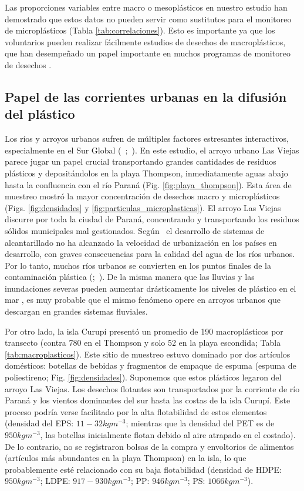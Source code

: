 Las proporciones variables entre macro o mesoplásticos en nuestro estudio han demostrado que estos datos no pueden servir como sustitutos para el monitoreo de microplásticos (Tabla \ref{tab:correlaciones}). Esto es importante ya que los voluntarios pueden realizar fácilmente estudios de desechos de macroplásticos, que han desempeñado un papel importante en muchos programas de monitoreo de desechos \parencite{RIBIC2012994}.

\subsection{Papel de las corrientes urbanas en la difusión del plástico}

Los ríos y arroyos urbanos sufren de múltiples factores estresantes interactivos, especialmente en el Sur Global (~\cite{WANG20171369};~\cite{wantzen2019urban}). En este estudio, el arroyo urbano Las Viejas parece jugar un papel crucial transportando grandes cantidades de residuos plásticos y depositándolos en la playa Thompson, inmediatamente aguas abajo hasta la confluencia con el río Paraná (Fig. \ref{fig:playa_thompson}). Esta área de muestreo mostró la mayor concentración de desechos macro y microplásticos (Figs. \ref{fig:densidades} y \ref{fig:particulas_microplasticas}). El arroyo Las Viejas discurre por toda la ciudad de Paraná, concentrando y transportando los residuos sólidos municipales mal gestionados. Según~\cite{Xu2019} el desarrollo de sistemas de alcantarillado no ha alcanzado la velocidad de urbanización en los países en desarrollo, con graves consecuencias para la calidad del agua de los ríos urbanos. Por lo tanto, muchos ríos urbanos se convierten en los puntos finales de la contaminación plástica (\cite{McCormick2014};~\cite{Mccormick2016}). De la misma manera que las lluvias y las inundaciones severas pueden aumentar drásticamente los niveles de plástico en el mar \parencite{GUNDOGDU2018342}, es muy probable que el mismo fenómeno opere en arroyos urbanos que descargan en grandes sistemas fluviales.

Por otro lado, la isla Curupí presentó un promedio de 190 macroplásticos por transecto (contra 780 en el Thompson y solo 52 en la playa escondida; Tabla \ref{tab:macroplasticos}). Este sitio de muestreo estuvo dominado por dos artículos domésticos: botellas de bebidas y fragmentos de empaque de espuma (espuma de poliestireno; Fig. \ref{fig:densidades}). Suponemos que estos plásticos legaron del arroyo Las Viejas. Los desechos flotantes son transportados por la corriente de río Paraná y los vientos dominantes del sur hasta las costas de la isla Curupí. Este proceso podría verse facilitado por la alta flotabilidad de estos elementos (densidad del EPS: $11-32 kg m^{-3}$; mientras que la densidad del PET es de $950 kg m^{-3}$, las botellas inicialmente flotan debido al aire atrapado en el costado). De lo contrario, no se registraron bolsas de la compra y envoltorios de alimentos (artículos más abundantes en la playa Thompson) en la isla, lo que probablemente esté relacionado con su baja flotabilidad (densidad de HDPE: $950 kg m^{-3}$; LDPE: $917-930 kg m^{-3}$; PP: $946 kg m^{-3}$; PS: $1066 kg m^{-3}$).

